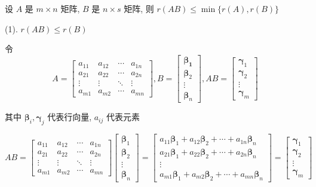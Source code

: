 \begin{proposition}
	设 $A$ 是 $m\times n$ 矩阵, $B$ 是 $n\times s$ 矩阵, 则 $r(AB)\leq \min\{r(A),r(B)\}$
\end{proposition}
\begin{anymark}[证明]
	(1). $r(AB) \leq r(B)$

	令 
	$$A  = \begin{bmatrix}
		a_{11} & a_{12} & \cdots & a_{1n}\\
		a_{21} & a_{22} & \cdots & a_{2n}\\
		\vdots & \vdots & \ddots & \vdots\\
		a_{m1} & a_{m2} & \cdots & a_{mn}
	\end{bmatrix}, 
	B =  \begin{bmatrix}
		\boldsymbol{\beta_{1}} \\ \boldsymbol{\beta}_{2} \\ \vdots \\ \boldsymbol{\beta}_{n}
	\end{bmatrix},
	AB = \begin{bmatrix}
		\boldsymbol{\gamma}_{1} \\ \boldsymbol{\gamma}_{2} \\ \vdots \\ \boldsymbol{\gamma}_{m}
	\end{bmatrix}$$

	其中 $\boldsymbol{\beta}_{i}, \boldsymbol{\gamma}_{j}$ 代表行向量, $a_{ij}$ 代表元素

	$$AB = 
	\begin{bmatrix}
		a_{11} & a_{12} & \cdots & a_{1n}\\
		a_{21} & a_{22} & \cdots & a_{2n}\\
		\vdots & \vdots & \ddots & \vdots\\
		a_{m1} & a_{m2} & \cdots & a_{mn}
	\end{bmatrix}
	\begin{bmatrix}
		\boldsymbol{\beta}_{1} \\ \boldsymbol{\beta}_{2} \\ \vdots \\ \boldsymbol{\beta}_{n}
	\end{bmatrix} = 
	\begin{bmatrix}
		a_{11}\boldsymbol{\beta}_{1}+a_{12}\boldsymbol{\beta}_{2}+\cdots+a_{1n}\boldsymbol{\beta}_{n}\\
		a_{21}\boldsymbol{\beta}_{1}+a_{22}\boldsymbol{\beta}_{2}+\cdots+a_{2n}\boldsymbol{\beta}_{n}\\
		\vdots\\
		a_{m1}\boldsymbol{\beta}_{1}+a_{m2}\boldsymbol{\beta}_{2}+\cdots+a_{mn}\boldsymbol{\beta}_{n}
	\end{bmatrix} = 
	\begin{bmatrix}
		\boldsymbol{\gamma}_{1} \\ \boldsymbol{\gamma}_{2} \\ \vdots \\ \boldsymbol{\gamma}_{m}
	\end{bmatrix}$$


\end{anymark}
